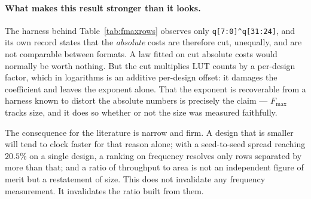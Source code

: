 \paragraph{What makes this result stronger than it looks.} The harness behind
Table~\ref{tab:fmaxrows} observes only \texttt{q[7:0]\^{}q[31:24]}, and its own
record states that the \emph{absolute} costs are therefore cut, unequally, and
are not comparable between formats. A law fitted on cut absolute costs would
normally be worth nothing. But the cut multiplies LUT counts by a per-design
factor, which in logarithms is an additive per-design offset: it damages the
coefficient and leaves the exponent alone. That the exponent is recoverable from
a harness known to distort the absolute numbers is precisely the claim ---
$F_{\max}$ tracks size, and it does so whether or not the size was measured
faithfully.

The consequence for the literature is narrow and firm. A design that is smaller
will tend to clock faster for that reason alone; with a seed-to-seed spread
reaching $20.5\%$ on a single design, a ranking on frequency resolves only rows
separated by more than that; and a ratio of throughput to area is not an
independent figure of merit but a restatement of size. This does not invalidate
any frequency measurement. It invalidates the ratio built from them.

%
